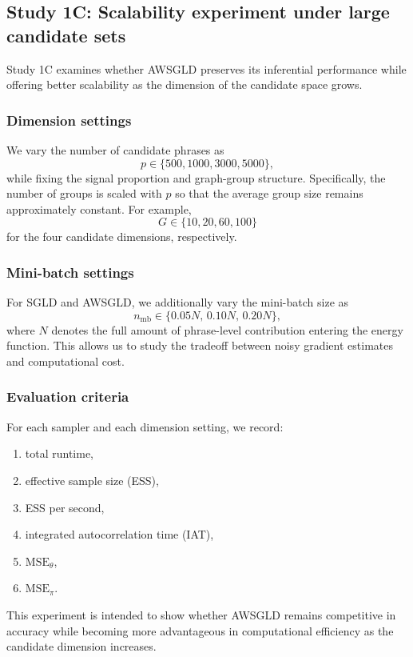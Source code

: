 \documentclass[11pt]{article}
\begin{document}
\subsection{Study 1C: Scalability experiment under large candidate sets}
\label{subsec:sim_scalability}

Study 1C examines whether AWSGLD preserves its inferential performance while offering better scalability as the dimension of the candidate space grows.

\subsubsection{Dimension settings}

We vary the number of candidate phrases as
\[
p \in \{500, 1000, 3000, 5000\},
\]
while fixing the signal proportion and graph-group structure. Specifically, the number of groups is scaled with $p$ so that the average group size remains approximately constant. For example,
\[
G \in \{10, 20, 60, 100\}
\]
for the four candidate dimensions, respectively.

\subsubsection{Mini-batch settings}

For SGLD and AWSGLD, we additionally vary the mini-batch size as
\[
n_{\mathrm{mb}} \in \{0.05N,\, 0.10N,\, 0.20N\},
\]
where $N$ denotes the full amount of phrase-level contribution entering the energy function. This allows us to study the tradeoff between noisy gradient estimates and computational cost.

\subsubsection{Evaluation criteria}

For each sampler and each dimension setting, we record:
\begin{enumerate}
    \item total runtime,
    \item effective sample size (ESS),
    \item ESS per second,
    \item integrated autocorrelation time (IAT),
    \item $\mathrm{MSE}_{\theta}$,
    \item $\mathrm{MSE}_{\pi}$.
\end{enumerate}
This experiment is intended to show whether AWSGLD remains competitive in accuracy while becoming more advantageous in computational efficiency as the candidate dimension increases.
\end{document}
